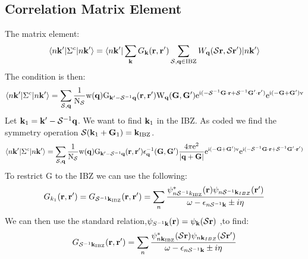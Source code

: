 \documentclass{article}
\def\r{{\bf r}}
\def\k{{\bf k}}
\def\q{{\bf q}}
\def\G{{\bf G}}
\def\S{\mathcal{S}}
\def\bra{\langle}
\def\ket{\rangle}
\begin{document}
\subsection{Correlation Matrix Element}
%
The matrix element:
%
\begin{equation}
\bra n\k'|\Sigma^{c}|n\k'\ket  = \bra n\k'|\sum_{\k} G_{\k}(\r,\r')\sum_{\S,\q\in{\rm IBZ}}W_{\q}(\S\r,\S\r')|n\k'\ket
\end{equation}
%
The condition is then:
%
\begin{equation}
\bra n\k'|\Sigma^{c}|n\k'\ket = \sum_{\S,\q} \frac{1}{\rm{N}_{\S}}\rm{w}(\q) G_{\k'-\S^{-1}\q}(\r,\r')W_{\q}(\G, \G')e^{i(-\S^{-1}\G\cdot\r+\S^{-1}\G'\cdot\r')}e^{i(-\G+\G')v}
\end{equation}
%
Let $\k_{1}=\k'-\S^{-1}\q$. We want to find $\k_{1}$ in the IBZ.
As coded we find the symmetry operation $\S(\k_{1}+\G_{1})= \k_{\rm IBZ}$.
%
\begin{equation}
\bra n\k'|\Sigma^{c}|n\k'\ket = \sum_{\S,\q} \frac{1}{\rm{N}_{\S}}\rm{w}(\q) G_{\k'-\S^{-1}\q}(\r,\r')\epsilon^{-1}_{\q}(\G, \G')\frac{4\pi e^{2}}{|\q+\G|}e^{i(-\G+\G')v}e^{i(-\S^{-1}\G\cdot\r+\S^{-1}\G'\cdot\r')}
\end{equation}
%
To restrict G to the IBZ we can use the following:
%
\begin{equation}
G_{k_{1}}(\r,\r')=G_{\S^{-1}\k_{\rm IBZ}}(\r,\r')=\sum_{n}\frac{\psi^{*}_{n \S^{-1}k_{\rm IBZ}}(\r)\psi_{n \S^{-1}\k_{IBZ}}(\r')}{\omega - \epsilon_{n\S^{-1}\k}\pm i\eta}
\end{equation}
%
We can then use the standard relation,$\psi_{S^{-1}\k}(\r) = \psi_{\k}(\S\r)$  ,to find:
\begin{equation}
G_{\S^{-1}\k_{\rm IBZ}}(\r,\r')=\sum_{n}\frac{\psi^{*}_{n \k_{\rm IBZ}}(\S\r)\psi_{n \k_{IBZ}}(\S\r')}{\omega - \epsilon_{n\S^{-1}\k}\pm i\eta}
\end{equation}
\end{document}
